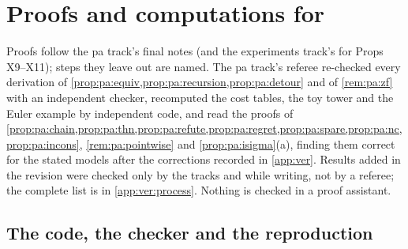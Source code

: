 \providecommand{\pabrk}{\hfil\penalty0\hfilneg}
\providecommand{\paR}[1]{\mathsf{R}_{#1}}

\section{Proofs and computations for \texorpdfstring{}{Section 7}}\label{app:pa}

Proofs follow the pa track's final notes (and the experiments track's for Props X9--X11); steps they leave out are named. The pa track's referee re-checked every derivation of \cref{prop:pa:equiv,prop:pa:recursion,prop:pa:detour} and of \cref{rem:pa:zf} with an independent checker, recomputed the cost tables, the toy tower and the Euler example by independent code, and read the proofs of \cref{prop:pa:chain,prop:pa:thn,prop:pa:refute,prop:pa:regret,prop:pa:spare,prop:pa:nc,prop:pa:incons}, \cref{rem:pa:pointwise} and \cref{prop:pa:isigma}(a), finding them correct for the stated models after the corrections recorded in \cref{app:ver}. Results added in the revision were checked only by the tracks and while writing, not by a referee; the complete list is in \cref{app:ver:process}. Nothing is checked in a proof assistant.

\subsection{The code, the checker and the reproduction}\label{app:pa:checker}

